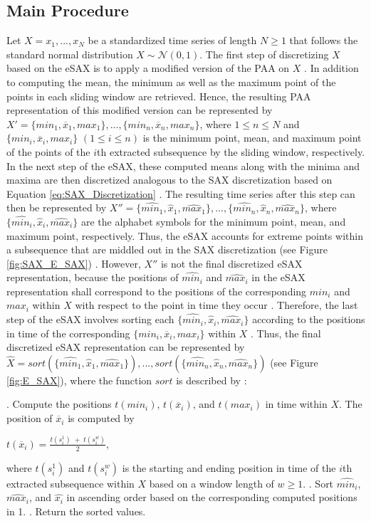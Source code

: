 \subsection*{Main Procedure}
Let $X = x_1, ..., x_N$ be a standardized time series of length $N \geq 1$ that follows the standard normal distribution $X \sim \mathcal{N}(0,1)$. The first step of discretizing $X$ based on the \ac{eSAX} is to apply a modified version of the PAA on $X$ \cite{E_SAX}. In addition to computing the mean, the minimum as well as the maximum point of the points in each sliding window are retrieved. Hence, the resulting \ac{PAA} representation of this modified version can be represented by $X' = \{min_1, \overline{x}_1, max_1\}, ..., \{min_n, \overline{x}_n, max_n\}$, where $1 \leq n \leq N$ and $\{min_i, \overline{x}_i, max_i\}$ $(1 \leq i \leq n)$ is the minimum point, mean, and maximum point of the points of the $i$th extracted subsequence by the sliding window, respectively. \newline
In the next step of the \ac{eSAX}, these computed means along with the minima and maxima are then discretized analogous to the \ac{SAX} discretization based on Equation \ref{eq:SAX_Discretization} \cite{E_SAX}. The resulting time series after this step can then be represented by $X'' = \{\hat{min_1}, \hat{x}_1, \hat{max_1}\}, ..., \{\hat{min_n}, \hat{x}_n, \hat{max_n}\}$, where $\{\hat{min_i}, \hat{x}_i, \hat{max_i}\}$ are the alphabet symbols for the minimum point, mean, and maximum point, respectively. Thus, the \ac{eSAX} accounts for extreme points within a subsequence that are middled out in the \ac{SAX} discretization (see Figure \ref{fig:SAX_E_SAX}) \cite{E_SAX}. \newline
However, $X''$ is not the final discretized \ac{eSAX} representation, because the positions of $\hat{min_i}$ and $\hat{max_i}$ in the \ac{eSAX} representation shall correspond to the positions of the corresponding $min_i$ and $max_i$ within $X$ with respect to the point in time they occur \cite{E_SAX}. \newline
Therefore, the last step of the \ac{eSAX} involves sorting each $\{\hat{min_i}, \hat{x}_i, \hat{max_i}\}$ according to the positions in time of the corresponding $\{min_i, \overline{x}_i, max_i\}$ within $X$ \cite{E_SAX}. Thus, the final discretized \ac{eSAX} representation can be represented by $\hat{X} = sort(\{\hat{min_1}, \hat{x}_1, \hat{max_1}\}), ..., sort(\{\hat{min_n}, \hat{x}_n, \hat{max_n}\})$ (see Figure \ref{fig:E_SAX}), where the function $sort$ is described by \cite{E_SAX}:
\begin{algorithmic}
. Compute the positions $t(min_i)$, $t(\overline{x}_i)$, and $t(max_i)$ in time within $X$. The position of $\overline{x}_i$ is computed by 
\begin{center}
$t(\overline{x}_i) = \frac{t(s_i^1) \;+\; t(s_i^w)}{2}$,
\end{center}
where $t(s_i^1)$ and $t(s_i^w)$ is the starting and ending position in time of the $i$th extracted subsequence within $X$ based on a window length of $w \geq 1$.
. Sort $\hat{min_i}$, $\hat{max_i}$, and $\hat{x_i}$ in ascending order based on the corresponding computed positions in 1.
. Return the sorted values.
\end{algorithmic}
